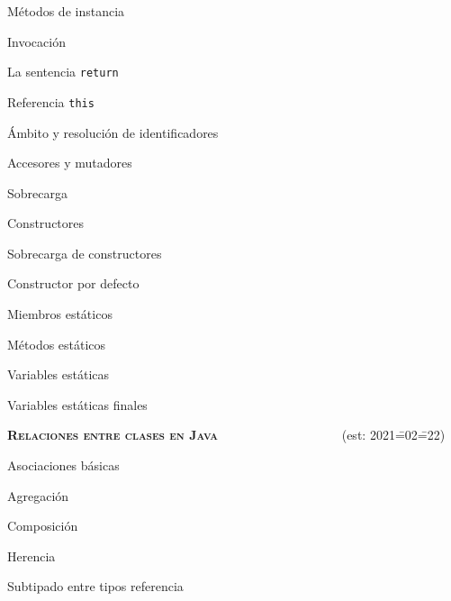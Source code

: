 \begin{longenum}
\begin{longenum}
\begin{longenum}
\begin{longenum}
            \end{longenum}
            \item Métodos de instancia
            \begin{longenum}
                \item Invocación
                \item La sentencia \texttt{return}
                \item Referencia \texttt{this}
                \item Ámbito y resolución de identificadores
                \item Accesores y mutadores
                \item Sobrecarga
                \item Constructores
                \begin{longenum}
                    \item Sobrecarga de constructores
                    \item Constructor por defecto
                \end{longenum}
            \end{longenum}
        \end{longenum}
        \item Miembros estáticos
        \begin{longenum}
            \item Métodos estáticos
            \item Variables estáticas
            \item Variables estáticas finales
        \end{longenum}
    \end{longenum}
    \item \textbf{\textsc{Relaciones entre clases en Java}} \ \ \ \ \ \ \ \ \ \ \ \ \ \ \ \ \ \ \ (est: 2021\==02\==22)
    \begin{longenum}
        \item Asociaciones básicas
        \begin{longenum}
            \item Agregación
            \item Composición
        \end{longenum}
        \item Herencia
        \begin{longenum}
            \item Subtipado entre tipos referencia

\end{longenum}
\end{longenum}
\end{longenum}
